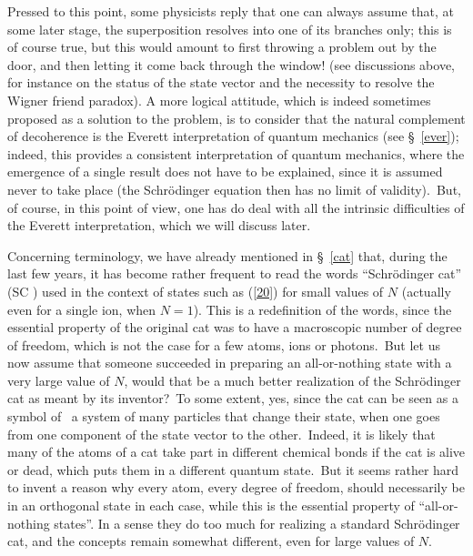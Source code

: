 \documentclass[12pt,onecolumn]{article}%
\begin{document}
Pressed to this point, some physicists reply that one can always assume that,
at some later stage, the superposition resolves into one of its branches only;
this is of course true, but this would amount to first throwing a problem out
by the door, and then letting it come back through the window! (see
discussions above, for instance on the status of the state vector and the
necessity to resolve the Wigner friend paradox). A more logical attitude,
which is indeed sometimes proposed as a solution to the problem, is to
consider that the natural complement of decoherence is the Everett
interpretation of quantum mechanics (see \S \ \ref{ever}); indeed, this
provides a consistent interpretation of quantum mechanics, where the emergence
of a single result does not have to be explained, since it is assumed never to
take place (the Schr\"{o}dinger equation then has no limit of validity).\ But,
of course, in this point of view, one has do deal with all the intrinsic
difficulties of the Everett interpretation, which we will discuss later.

Concerning terminology, we have already mentioned in \S \ \ref{cat} that,
during the last few years, it has become rather frequent to read the words
``Schr\"{o}dinger cat'' (SC ) used in the context of states such as (\ref{20})
for small values of $N$ (actually even for a single ion, when $N=1$). This is
a redefinition of the words, since the essential property of the original cat
was to have a macroscopic number of degree of freedom, which is not the case
for a few atoms, ions or photons.\ But let us now assume that someone
succeeded in preparing an all-or-nothing state with a very large value of $N$,
would that be a much better realization of the Schr\"{o}dinger cat as meant by
its inventor?\ To some extent, yes, since the cat can be seen as a symbol of
\ a system of many particles that change their state, when one goes from one
component of the state vector to the other.\ Indeed, it is likely that many of
the atoms of a cat take part in different chemical bonds if the cat is alive
or dead, which puts them in a different quantum state.\ But it seems rather
hard to invent a reason why every atom, every degree of freedom, should
necessarily be in an orthogonal state in each case, while this is the
essential property of ``all-or-nothing states''. In a sense they do too much
for realizing a standard Schr\"{o}dinger cat, and the concepts remain somewhat
different, even for large values of $N$.
\end{document}
